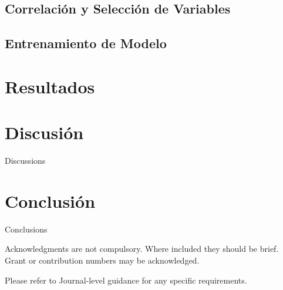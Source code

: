 \documentclass[sn-mathphys,Numbered]{sn-jnl}%
\theoremstyle{thmstyleone}%
\theoremstyle{thmstyletwo}%
\theoremstyle{thmstylethree}%
\begin{document}
\subsection{Correlación y Selección de Variables}\label{subsec5}


\subsection{Entrenamiento de Modelo}\label{subsec6}

\section{Resultados}\label{sec4}


\section{Discusión}\label{sec5}

Discussions

\section{Conclusión}\label{sec6}

Conclusions

\backmatter



Acknowledgments are not compulsory. Where included they should be brief. Grant or contribution numbers may be acknowledged.

Please refer to Journal-level guidance for any specific requirements.
\end{document}
